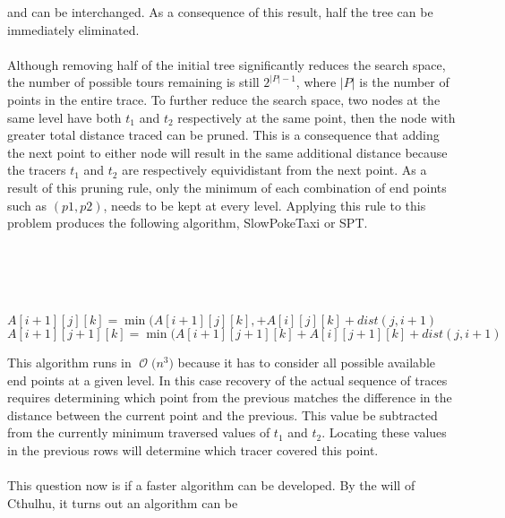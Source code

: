 \documentclass[12pt]{article}
\newcommand{\BigO}[1]{\ensuremath{\operatorname{\mathcal{O}}\bigl(#1\bigr)}}
\begin{document}
and can be interchanged.  As a consequence of this result, half the
tree can be immediately eliminated.\\\\
Although removing half of the initial tree significantly reduces
the search space, the number of possible tours remaining is still
$2^{|P|-1}$, where $|P|$ is the number of points in the entire 
trace.  To further reduce the search space, two nodes at the same
level have both $t_1$ and $t_2$ respectively at the same point, then
the node with greater total distance traced can be pruned.  This is
a consequence that adding the next point to either node will result
in the same additional distance because the tracers $t_1$ and $t_2$
are respectively equividistant from the next point.  As a result
of this pruning rule, only the minimum of each combination of end points
such as $(p1,p2)$, needs to be kept at every level.  Applying this
rule to this problem produces the following algorithm, SlowPokeTaxi or
SPT\@.\\\\
\begin{algorithm}[H]
\\
\\
\\
 {
     {
         {
             {
                $A[i+1][j][k] = \min(A[i+1][j][k], + A[i][j][k] + dist(j,i+1)$\\
                $A[i+1][j+1][k] = \min(A[i+1][j+1][k] + A[i][j+1][k] + dist(j,i+1)$\\
            }
        }
    }
}
\end{algorithm}
This algorithm runs in \BigO{n^3} because it has to consider all
possible available end points at a given level.  In this case
recovery of the actual sequence of traces requires determining
which point from the previous matches the difference in the 
distance between the current point and the previous.  This value
be subtracted from the currently minimum traversed values of $t_1$
and $t_2$.  Locating these values in the previous rows will 
determine which tracer covered this point.\\\\
This question now is if a faster algorithm can be developed.
By the will of Cthulhu, it turns out an algorithm can be
\end{document}
